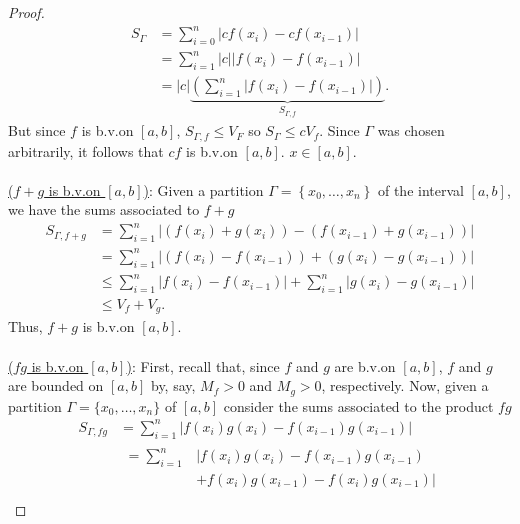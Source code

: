 \begin{proof}
  \begin{equation}
    \label{eq:1:4}
    \begin{aligned}
      S_\Gamma&=\sum_{i=0}^n|cf(x_i)-cf(x_{i-1})|\\
      &=\sum_{i=1}^n|c||f(x_i)-f(x_{i-1})|\\
      &=|c|\underbrace{\left(\sum_{i=1}^n|f(x_i)-f(x_{i-1})|\right)}_{S_{\Gamma,f}}.
    \end{aligned}
  \end{equation}
  But since $f$ is b.v.\@ on $[a,b]$, $S_{\Gamma,f}\leq V_F$ so
  $S_\Gamma\leq cV_f$. Since $\Gamma$ was chosen arbitrarily, it follows
  that $cf$ is b.v.\@ on $[a,b]$.  $x\in[a,b]$.
  \\\\
  \underline{($f+g$ is b.v.\@ on $[a,b]$)}: Given a partition
  $\Gamma=\left\{ x_0,\dotsc,x_n \right\}$ of the interval $[a,b]$, we have
  the sums associated to $f+g$
  \begin{equation}
    \label{eq:1:5}
    \begin{aligned}
      S_{\Gamma,f+g}
      &=\sum_{i=1}^n\left|(f(x_i)+g(x_i))-(f(x_{i-1})+g(x_{i-1}))\right|\\
      &=\sum_{i=1}^n\left|(f(x_i)-f(x_{i-1}))+(g(x_i)-g(x_{i-1}))\right|\\
      &\leq\sum_{i=1}^n|f(x_i)-f(x_{i-1})|+\sum_{i=1}^n|g(x_i)-g(x_{i-1})|\\
      &\leq V_f+V_g.
    \end{aligned}
  \end{equation}
  Thus, $f+g$ is b.v.\@ on $[a,b]$.
  \\\\
  \underline{($fg$ is b.v.\@ on $[a,b]$)}: First, recall that, since $f$
  and $g$ are b.v.\@ on $[a,b]$, $f$ and $g$ are bounded on $[a,b]$ by,
  say, $M_f>0$ and $M_g>0$, respectively. Now, given a partition
  $\Gamma=\{x_0,\dotsc,x_n\}$ of $[a,b]$ consider the sums associated to
  the product $fg$
  \begin{equation}
    \label{eq:1:6}
    \begin{aligned}
      S_{\Gamma,fg}
      &=\sum_{i=1}^n\left|f(x_i)g(x_i)-f(x_{i-1})g(x_{i-1})\right|\\
      &\begin{aligned}
        =\sum_{i=1}^n
        &\left|f(x_i)g(x_i)-f(x_{i-1})g(x_{i-1})\right.\\
        &\left.+f(x_i)g(x_{i-1})-f(x_i)g(x_{i-1})\right|
      \end{aligned}\\

\end{aligned}
\end{equation}
\end{proof}
